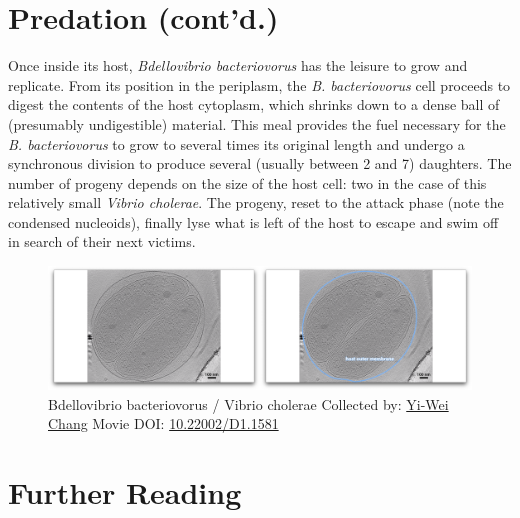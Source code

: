 \documentclass[]{tufte-book}
\begin{document}
\section{Predation (cont'd.)}\label{predation-contd.-1}

Once inside its host, \emph{Bdellovibrio bacteriovorus} has the leisure
to grow and replicate. From its position in the periplasm, the \emph{B.
bacteriovorus} cell proceeds to digest the contents of the host
cytoplasm, which shrinks down to a dense ball of (presumably
undigestible) material. This meal provides the fuel necessary for the
\emph{B. bacteriovorus} to grow to several times its original length and
undergo a synchronous division to produce several (usually between 2 and
7) daughters. The number of progeny depends on the size of the host
cell: two in the case of this relatively small \emph{Vibrio cholerae}.
The progeny, reset to the attack phase (note the condensed nucleoids),
finally lyse what is left of the host to escape and swim off in search
of their next victims.





\begin{figure}
\includegraphics{movie_stills/9_11} \caption[Bdellovibrio bacteriovorus / Vibrio cholerae Collected by:
\protect\hyperlink{yi-wei_chang}{Yi-Wei Chang} Movie DOI:
\href{https://doi.org/10.22002/D1.1581}{10.22002/D1.1581}]{Bdellovibrio bacteriovorus / Vibrio cholerae Collected by:
\protect\hyperlink{yi-wei_chang}{Yi-Wei Chang} Movie DOI:
\href{https://doi.org/10.22002/D1.1581}{10.22002/D1.1581}}\label{fig:9-11}
\end{figure}

\section{Further Reading}\label{further-reading-8}

\citep{christie2019}

\citep{flemming2016}

\citep{patz2019}

\citep{sockett2009}
\end{document}
